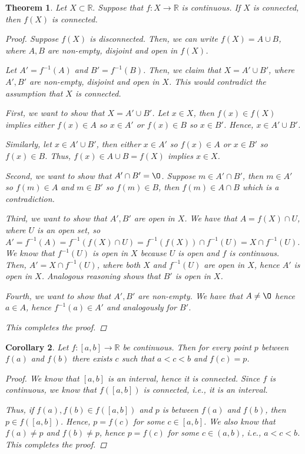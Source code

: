 \documentclass[11pt]{article}
\newcommand{\bbR}{\mathbb{R}}
\renewcommand{\emptyset}{\O}
\providecommand{\arr}{\to}
\renewcommand{\_}[1]{\underline{ #1 }}
\newtheorem{theorem}{Theorem}[section]
\newtheorem{corollary}[theorem]{Corollary}
\theoremstyle{definition}
\numberwithin{equation}{subsection}
\begin{document}
\begin{theorem}
Let $X\subset \bbR.$ Suppose that $f \colon X \arr \bbR$ is continuous.  If $X$ is connected, then $f(X)$ is connected.

\begin{proof}
Suppose $f(X)$ is disconnected. Then, we can write $f(X)=A \cup B$, where $A,B$ are non-empty, disjoint and open in $f(X)$.

Let $A'= f^{-1}(A)$ and $B'= f^{-1}(B)$. Then, we claim that $X=A' \cup B'$, where $A',B'$ are non-empty, disjoint and open in $X$. This would contradict the assumption that $X$ is connected.

First, we want to show that $X=A' \cup B'$. Let $x \in X$, then $f(x) \in f(X)$ implies either $f(x) \in A$ so $x \in A'$ or $f(x) \in B$ so $x \in B'$. Hence, $x \in A' \cup B'$. 

Similarly, let $x \in A' \cup B'$, then either $x \in A'$ so $f(x) \in A$ or $x \in B'$ so $f(x) \in B$. Thus, $f(x) \in A \cup B=f(X)$ implies $x \in X$.

Second, we want to show that $A' \cap B' = \emptyset$. Suppose $m \in A' \cap B'$, then $m \in A'$ so $f(m) \in A$ and $m \in B'$ so $f(m) \in B$, then $f(m) \in A \cap B$ which is a contradiction.

Third, we want to show that $A',B'$ are open in $X$. We have that $A = f(X) \cap U$, where $U$ is an open set, so $A'= f^{-1}(A) = f^{-1}(f(X) \cap U) = f^{-1}(f(X)) \cap f^{-1}(U) = X \cap f^{-1}(U)$. We know that $f^{-1}(U)$ is open in $X$ because $U$ is open and $f$ is continuous. Then, $A' = X \cap f^{-1}(U)$, where both $X$ and $f^{-1}(U)$ are open in $X$, hence $A'$ is open in $X$. Analogous reasoning shows that $B'$ is open in $X$.

Fourth, we want to show that $A',B'$ are non-empty. We have that $A \neq \emptyset$ hence $a \in A$, hence $f^{-1}(a) \in A'$ and analogously for $B'$.

This completes the proof.

\renewcommand\qedsymbol{QED}
\end{proof}


\end{theorem}

\begin{corollary}  
Let $f\colon [a,b] \arr \bbR $ be continuous. Then for every point $p$ between $f(a)$ and $f(b)$ there exists $c$ such that $a<c<b$ and $f(c)=p$. 

\begin{proof}
We know that $[a,b]$ is an interval, hence it is connected. Since $f$ is continuous, we know that $f([a,b])$ is connected, i.e., it is an interval.

Thus, if $f(a),f(b) \in f([a,b])$ and $p$ is between $f(a)$ and $f(b)$, then $p \in f([a,b])$. Hence, $p = f(c)$ for some $c \in [a,b]$. We also know that $f(a)\neq p$ and $f(b) \neq p$, hence $p=f(c)$ for some $c \in (a,b)$, i.e., $a<c<b$. This completes the proof.


\renewcommand\qedsymbol{QED}
\end{proof}


\end{corollary}
\end{document}
